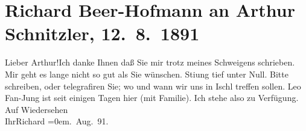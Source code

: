 

         
         \renewcommand{\erwaehntePersonen}{Personen: Leo Van-Jung}
         \renewcommand{\erwaehnteOrte}{Orte: Bad Aussee, Bad Ischl}
         \renewcommand{\erwaehnteWerke}{}
               \section[Richard Beer-Hofmann an Arthur Schnitzler, 12. 8. 1891]{ Richard Beer-Hofmann an Arthur Schnitzler, 12. 8. 1891}\nopagebreak{}\rehead{ }\begin{ledgroupsized}[t]{13cm}\normalsize\beginnumbering \toendnotes[C]{\smallbreak\pagebreak[2]} 
\pstart
           \noindent{}{\pb}Lieber Arthur!\hspace*{2em}Ich danke Ihnen daß Sie mir trotz meines Schweigens
               schrieben. Mir geht es lange nicht so gut als Sie wünschen. Sti{\geminationm}ung tief unter Null. Bitte schreiben, oder telegrafiren
               Sie; wo und wann wir uns in Ischl treffen sollen.
                  Leo Fan-Jung ist seit einigen Tagen hier (mit Familie). Ich stehe also zu
               Verfügung.\pend
           \pstart
           Auf Wiedersehen{\\[\baselineskip]}Ihr\spacefill\mbox{Richard}\pend
           \leftskip=0em{}. Aug. 91.\pend
           
         
         \endnumbering{}\end{ledgroupsized}  \newcommand{\dateiname}{L00031}\newcommand{\titel}{Richard Beer-Hofmann an Arthur Schnitzler, 12. 8. 1891}\newcommand{\editorInnen}{Martin Anton Müller und Gerd-Hermann Susen}
      